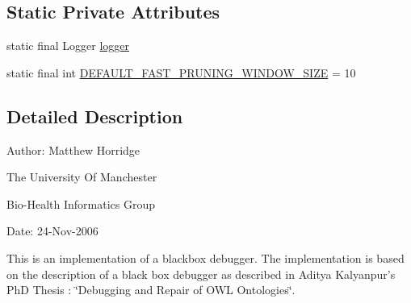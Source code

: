 \subsection*{Static Private Attributes}
\begin{DoxyCompactItemize}
\item 
static final Logger \hyperlink{classorg_1_1semanticweb_1_1owlapi_1_1debugging_1_1_black_box_o_w_l_debugger_a85312e03d05fc828e56f0760c52e1845}{logger}
\item 
static final int \hyperlink{classorg_1_1semanticweb_1_1owlapi_1_1debugging_1_1_black_box_o_w_l_debugger_a57919f2e0facb2c18371aa2768b246d8}{D\-E\-F\-A\-U\-L\-T\-\_\-\-F\-A\-S\-T\-\_\-\-P\-R\-U\-N\-I\-N\-G\-\_\-\-W\-I\-N\-D\-O\-W\-\_\-\-S\-I\-Z\-E} = 10
\end{DoxyCompactItemize}


\subsection{Detailed Description}
Author\-: Matthew Horridge\par
 The University Of Manchester\par
 Bio-\/\-Health Informatics Group\par
 Date\-: 24-\/\-Nov-\/2006\par
 \par
 

This is an implementation of a blackbox debugger. The implementation is based on the description of a black box debugger as described in Aditya Kalyanpur's Ph\-D Thesis \-: \char`\"{}\-Debugging and Repair of O\-W\-L Ontologies\char`\"{}. 

